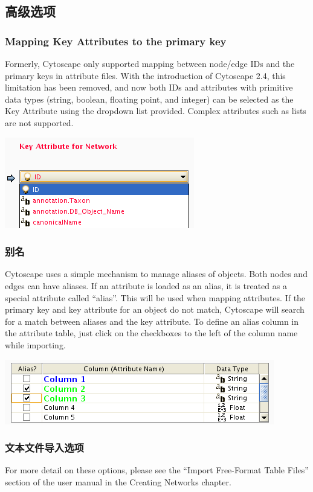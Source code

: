 \subsection{高级选项}
\subsubsection{Mapping Key Attributes to the primary key}
Formerly, Cytoscape only supported mapping between node/edge IDs and the
primary keys in attribute files. With the introduction of Cytoscape 2.4, this
limitation has been removed, and now both IDs and attributes with primitive
data types (string, boolean, floating point, and integer) can be selected as
the Key Attribute using the dropdown list provided. Complex attributes such as
lists are not supported. 


 \includegraphics[width=.3\textwidth]{images/attribute_table_import_keyattr.png} 
 
\subsubsection{别名}
 Cytoscape uses a simple mechanism to manage aliases of objects. Both nodes and
edges can have aliases. If an attribute is loaded as an alias, it is treated as
a special attribute called ``alias''. This will be used when mapping
attributes. If the primary key and key attribute for an object do not match,
Cytoscape will search for a match between aliases and the key attribute. To
define an alias column in the attribute table, just click on the checkboxes to
the left of the column name while importing. 

\includegraphics[width=.3\textwidth]{images/attribute_table_import_alias.png} 
 
\subsubsection{文本文件导入选项}
For more detail on these options, please see the ``Import Free-Format Table
Files'' section of the user manual in the Creating Networks chapter. 

